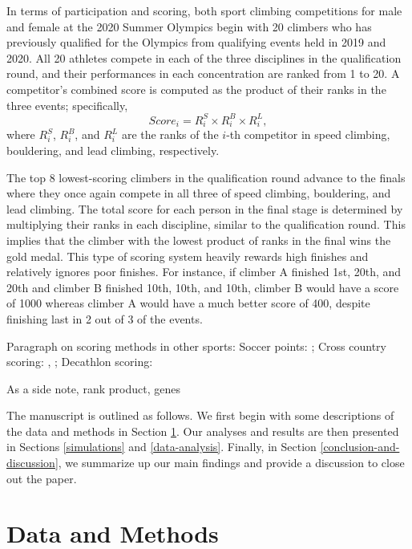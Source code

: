 \documentclass[12pt]{article}
\begin{document}
In terms of participation and scoring, both sport climbing competitions
for male and female at the 2020 Summer Olympics begin with 20 climbers
who has previously qualified for the Olympics from qualifying events
held in 2019 and 2020. All 20 athletes compete in each of the three
disciplines in the qualification round, and their performances in each
concentration are ranked from 1 to 20. A competitor's combined score is
computed as the product of their ranks in the three events;
specifically, \begin{equation}
Score_i = R^S_i\times R^B_i\times R^L_i,
\end{equation} where \(R^S_i\), \(R^B_i\), and \(R^L_i\) are the ranks
of the \(i\)-th competitor in speed climbing, bouldering, and lead
climbing, respectively.

The top 8 lowest-scoring climbers in the qualification round advance to
the finals where they once again compete in all three of speed climbing,
bouldering, and lead climbing. The total score for each person in the
final stage is determined by multiplying their ranks in each discipline,
similar to the qualification round. This implies that the climber with
the lowest product of ranks in the final wins the gold medal. This type
of scoring system heavily rewards high finishes and relatively ignores
poor finishes. For instance, if climber A finished 1st, 20th, and 20th
and climber B finished 10th, 10th, and 10th, climber B would have a
score of 1000 whereas climber A would have a much better score of 400,
despite finishing last in 2 out of 3 of the events.

Paragraph on scoring methods in other sports: Soccer points:
\citet{haugen2008}; Cross country scoring: \citet{hammond2007},
\citet{boudreau2018}; Decathlon scoring: \citet{westera2006}

As a side note, rank product, genes

The manuscript is outlined as follows. We first begin with some
descriptions of the data and methods in Section \ref{data-and-methods}.
Our analyses and results are then presented in Sections
\ref{simulations} and \ref{data-analysis}. Finally, in Section
\ref{conclusion-and-discussion}, we summarize up our main findings and
provide a discussion to close out the paper.

\hypertarget{data-and-methods}{%
\section{Data and Methods}\label{data-and-methods}}
\end{document}
